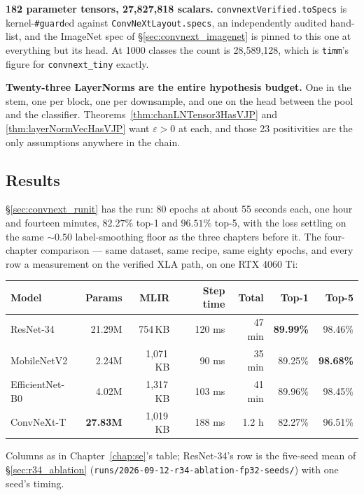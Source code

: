 \textbf{182 parameter tensors, 27,827,818 scalars.}
\texttt{convnextVerified.toSpecs} is kernel-\texttt{\#guard}ed against
\texttt{ConvNeXtLayout.specs}, an independently audited hand-list, and
the ImageNet spec of \S\ref{sec:convnext_imagenet} is pinned to this one
at everything but its head. At 1000 classes the count is 28,589,128,
which is \texttt{timm}'s figure for \texttt{convnext\_tiny} exactly.

\textbf{Twenty-three LayerNorms are the entire hypothesis budget.} One in
the stem, one per block, one per downsample, and one on the head between
the pool and the classifier.
Theorems~\ref{thm:chanLNTensor3HasVJP} and \ref{thm:layerNormVecHasVJP}
want $\varepsilon > 0$ at each, and
those 23 positivities are the only assumptions anywhere in the chain.

\subsection*{Results}
\label{sec:convnext_results}

\S\ref{sec:convnext_runit} has the run: 80 epochs at about 55 seconds
each, one hour and fourteen minutes, $\mathbf{82.27\%}$ top-1 and
$\mathbf{96.51\%}$ top-5, with the loss settling on the same
${\sim}0.50$ label-smoothing floor as the three chapters before it. The
four-chapter comparison --- same dataset, same recipe, same eighty epochs,
and every row a measurement on the verified XLA path, on one RTX 4060 Ti:

\begin{center}
\begin{tabular}{l r r r r r r}
\hline
Model            & Params  & MLIR       & Step time & Total    & Top-1 & Top-5 \\
\hline
ResNet-34        & 21.29M  & 754\,KB    & 120 ms    & 47 min   & \textbf{89.99\%} & 98.46\% \\
MobileNetV2      &  2.24M  & 1{,}071\,KB &  90 ms   & 35 min   & 89.25\% & \textbf{98.68\%} \\
EfficientNet-B0  &  4.02M  & 1{,}317\,KB & 103 ms   & 41 min   & 89.96\% & 98.45\% \\
ConvNeXt-T       & \textbf{27.83M} & 1{,}019\,KB & 188 ms & 1.2 h & 82.27\% & 96.51\% \\
\hline
\end{tabular}
\end{center}

\noindent Columns as in Chapter~\ref{chap:se}'s table; ResNet-34's row is the five-seed mean of \S\ref{sec:r34_ablation}
(\texttt{runs/2026-09-12-r34-ablation-fp32-seeds/}) with one seed's timing.

